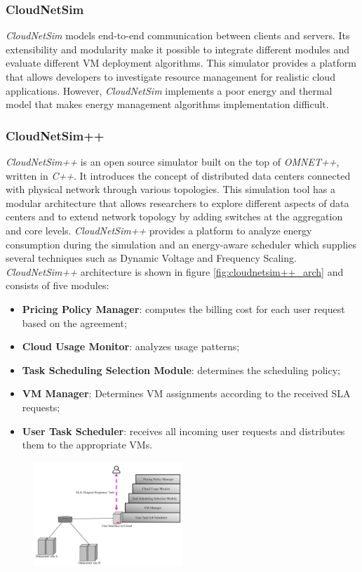 {\subsubsection*{CloudNetSim}
\emph{CloudNetSim} \cite{cucinotta2013cloudnetsim} models end-to-end communication between clients and servers. Its extensibility and modularity make it possible to integrate different modules and evaluate different VM deployment algorithms. This simulator provides a platform that allows developers to investigate resource management for realistic cloud applications. However, \emph{CloudNetSim} implements a poor energy and thermal model that makes energy management algorithms implementation difficult. \cite{mansouri2020cloud}
\subsubsection{CloudNetSim++}
\emph{CloudNetSim++} \cite{malik2014cloudnetsim++} is an open source simulator built on the top of \emph{OMNET++}, written in \emph{C++}. It introduces the concept of distributed data centers connected with physical network through various topologies. This simulation tool has a modular architecture that allows researchers to explore different aspects of data centers and to extend network topology by adding switches at the aggregation and core levels. \emph{CloudNetSim++} provides a platform to analyze energy consumption during the simulation and an energy-aware scheduler which supplies several techniques such as Dynamic Voltage and Frequency Scaling. 
\emph{CloudNetSim++} architecture is shown in figure \ref{fig:cloudnetsim++_arch} and consists of five modules:
\begin{itemize}
    \item \textbf{Pricing Policy Manager}: computes the billing cost for each user request based on the agreement;
    \item \textbf{Cloud Usage Monitor}: analyzes usage patterns;
    \item \textbf{Task Scheduling Selection Module}: determines the scheduling policy;
    \item \textbf{VM Manager}: Determines VM assignments according to the received SLA requests;
    \item \textbf{User Task Scheduler}: receives all incoming user requests and distributes them to the appropriate VMs.
\end{itemize}
\begin{figure}[h]
    \centering
    \includegraphics[width=0.5\textwidth]{capitoli/images/cloudnetsim++_arch.png}

\end{figure}}
